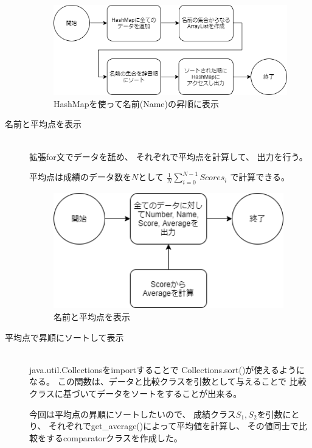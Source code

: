 \documentclass[dvipdfmx]{jsarticle}
\begin{document}
\begin{description}
    \begin{figure}[H]
      \centering
      \includegraphics[width=13cm]{../pic/fc3.png}
      \caption{HashMapを使って名前(Name)の昇順に表示}
    \end{figure}

    \item[名前と平均点を表示]\mbox{}\\
    拡張for文でデータを舐め、
    それぞれで平均点を計算して、
    出力を行う。

    平均点は成績のデータ数を$N$として
    $\displaystyle　\frac{1}{N} \sum_{i=0}^{N-1} Scores_i$
    で計算できる。

    \begin{figure}[H]
      \begin{center}
        \includegraphics[width=10cm]{../pic/fc4.png}
        \caption{名前と平均点を表示}
      \end{center}
    \end{figure}

    \item[平均点で昇順にソートして表示]\mbox{}\\
    java.util.Collectionsをimportすることで
    Collections.sort()が使えるようになる。
    この関数は、データと比較クラスを引数として与えることで
    比較クラスに基づいてデータをソートをすることが出来る。
    
    今回は平均点の昇順にソートしたいので、
    成績クラス$S_1, S_2$を引数にとり、
    それぞれでget\_average()によって平均値を計算し、
    その値同士で比較をするcomparatorクラスを作成した。


\end{description}
\end{document}

